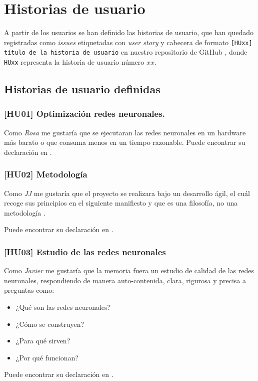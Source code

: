 \section{Historias de usuario}   \label{ch:metodología_personas_historias_de_usuario}

A partir de los usuarios se han definido las historias de usuario, que han quedado registradas 
como \textit{issues} etiquetadas con \textit{user story} y cabecera de formato
\texttt{[HUxx] título de la historia de usuario} en nuestro 
repositorio de GitHub \cite{TFG-Estudio-de-las-redes-neuronales},
 donde \texttt{HUxx} representa
la historia de usuario número $xx$.   

\subsection{Historias de usuario definidas} 

\subsubsection*{[HU01] Optimización redes neuronales.}\label{HU01}
    Como \textit{Rosa} me gustaría que se ejecutaran las redes neuronales en un hardware
    más barato o que consuma menos en un tiempo razonable.
Puede encontrar su declaración en \cite{TFG-Estudio-de-las-redes-neuronales-HU01}. 

\subsubsection*{ [HU02] Metodología} \label{HUO2}

Como \textit{JJ} me gustaría que el proyecto se realizara bajo un desarrollo ágil,  el cuál recoge sus principios en el siguiente manifiesto \cite{principios-manifiesto-agil} y que es una filosofía, no una metodología \cite{why-agile-is-not-a-methodology-1} \cite{why-agile-is-not-a-methodology-2}.

Puede encontrar su declaración en \cite{TFG-Estudio-de-las-redes-neuronales-HU02}.  

\subsubsection*{ [HU03] Estudio de las redes neuronales} \label{HUO3}
Como \textit{Javier} me gustaría que la memoria fuera un estudio de calidad de las redes neuronales, 
respondiendo de manera auto-contenida, clara, rigurosa y precisa a preguntas como:
\begin{itemize}
    \item ¿Qué son las redes neuronales?
    \item ¿Cómo se construyen?
    \item ¿Para qué sirven?
    \item ¿Por qué funcionan?
\end{itemize}
Puede encontrar su declaración en \cite{TFG-Estudio-de-las-redes-neuronales-HU03}.


